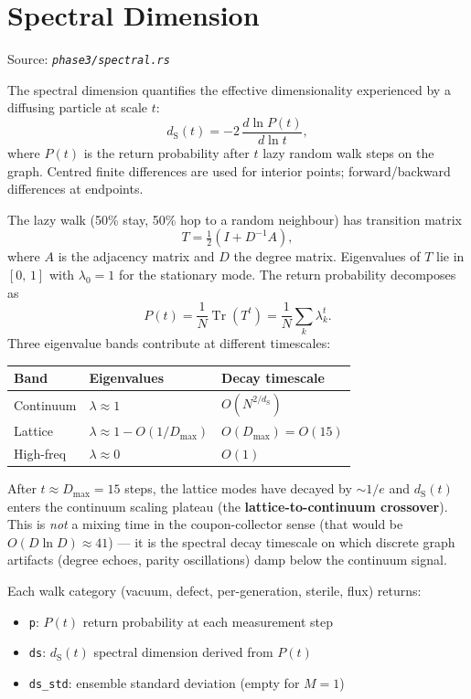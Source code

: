 \documentclass[11pt, a4paper, openany]{book}
\newcommand{\dS}{d_{\mathrm{S}}}
\newcommand{\code}[1]{\texttt{#1}}
\newcommand{\file}[1]{\texttt{\itshape #1}}
\begin{document}
\section{Spectral Dimension}

Source: \file{phase3/spectral.rs}

The spectral dimension quantifies the effective dimensionality experienced by a
diffusing particle at scale $t$:
\[
  \dS(t) = -2\,\frac{d \ln P(t)}{d \ln t},
\]
where $P(t)$ is the return probability after $t$ lazy random walk steps on the
graph.  Centred finite differences are used for interior points; forward/backward
differences at endpoints.

The lazy walk (50\% stay, 50\% hop to a random neighbour) has transition matrix
\[
  T = \tfrac{1}{2}(I + D^{-1}A),
\]
where $A$ is the adjacency matrix and $D$ the degree matrix.  Eigenvalues of $T$
lie in $[0,\,1]$ with $\lambda_0 = 1$ for the stationary mode.  The return
probability decomposes as
\[
  P(t) = \frac{1}{N}\operatorname{Tr}(T^t) = \frac{1}{N}\sum_{k} \lambda_k^{t}.
\]
Three eigenvalue bands contribute at different timescales:

\begin{center}
\begin{tabular}{lll}
  \toprule
  \textbf{Band} & \textbf{Eigenvalues} & \textbf{Decay timescale} \\
  \midrule
  Continuum & $\lambda \approx 1$ & $O(N^{2/\dS})$ \\
  Lattice   & $\lambda \approx 1 - O(1/D_{\max})$ & $O(D_{\max}) = O(15)$ \\
  High-freq & $\lambda \approx 0$ & $O(1)$ \\
  \bottomrule
\end{tabular}
\end{center}

After $t \approx D_{\max} = 15$ steps, the lattice modes have decayed by
$\sim 1/e$ and $\dS(t)$ enters the continuum scaling plateau (the
\textbf{lattice-to-continuum crossover}).  This is \emph{not} a mixing time in
the coupon-collector sense (that would be $O(D \ln D) \approx 41$) --- it is the
spectral decay timescale on which discrete graph artifacts (degree echoes,
parity oscillations) damp below the continuum signal.

\begin{definition}[WalkResult]
  Each walk category (vacuum, defect, per-generation, sterile, flux) returns:
  \begin{itemize}
    \item \code{p}: $P(t)$ return probability at each measurement step
    \item \code{ds}: $\dS(t)$ spectral dimension derived from $P(t)$
    \item \code{ds\_std}: ensemble standard deviation (empty for $M = 1$)
  \end{itemize}
\end{definition}
\end{document}

